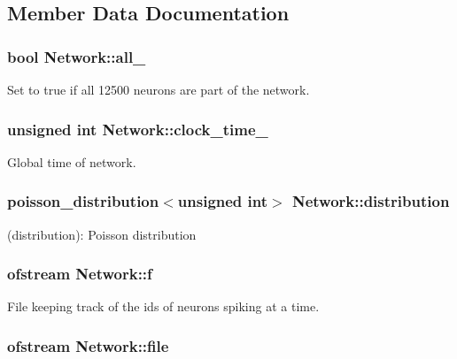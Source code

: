 \subsection{Member Data Documentation}
\hypertarget{classNetwork_a4ae561779053e1b5be2422cb3170417a}{
\subsubsection[{all\-\_\-}]{\setlength{\rightskip}{0pt plus 5cm}bool Network\-::all\-\_\-\hspace{0.3cm}{\ttfamily [private]}}}\label{classNetwork_a4ae561779053e1b5be2422cb3170417a}
Set to true if all 12500 neurons are part of the network. \hypertarget{classNetwork_a18d3152b3b67965689cb9aa2241eea60}{
\subsubsection[{clock\-\_\-time\-\_\-}]{\setlength{\rightskip}{0pt plus 5cm}unsigned int Network\-::clock\-\_\-time\-\_\-\hspace{0.3cm}{\ttfamily [private]}}}\label{classNetwork_a18d3152b3b67965689cb9aa2241eea60}
Global time of network. \hypertarget{classNetwork_a8bf522b67910db2becace84c61e24336}{
\subsubsection[{distribution}]{\setlength{\rightskip}{0pt plus 5cm}poisson\-\_\-distribution$<$unsigned int$>$ Network\-::distribution\hspace{0.3cm}{\ttfamily [private]}}}\label{classNetwork_a8bf522b67910db2becace84c61e24336}
(distribution)\-: Poisson distribution \hypertarget{classNetwork_a278c3f19603f68ef1bd0b6e52f04d2db}{
\subsubsection[{f}]{\setlength{\rightskip}{0pt plus 5cm}ofstream Network\-::f\hspace{0.3cm}{\ttfamily [private]}}}\label{classNetwork_a278c3f19603f68ef1bd0b6e52f04d2db}
File keeping track of the ids of neurons spiking at a time. \hypertarget{classNetwork_a92dc3befe6139a49991f2457d81884e1}{
\subsubsection[{file}]{\setlength{\rightskip}{0pt plus 5cm}ofstream Network\-::file\hspace{0.3cm}{\ttfamily [private]}}}\label{classNetwork_a92dc3befe6139a49991f2457d81884e1}
